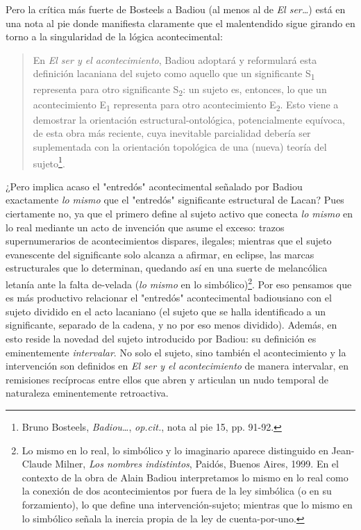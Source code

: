 Pero la crítica más fuerte de Bosteels a Badiou (al menos al de \emph{El
ser\ldots{}}) está en una nota al pie donde manifiesta claramente que el
malentendido sigue girando en torno a la singularidad de la lógica
acontecimental:

\begin{quote}
En \emph{El ser y el acontecimiento}, Badiou adoptará y reformulará esta
definición lacaniana del sujeto como aquello que un significante
S\textsubscript{1} representa para otro significante S\textsubscript{2}:
un sujeto es, entonces, lo que un acontecimiento E\textsubscript{1}
representa para otro acontecimiento E\textsubscript{2}. Esto viene a
demostrar la orientación estructural-ontológica, potencialmente
equívoca, de esta obra más reciente, cuya inevitable parcialidad debería
ser suplementada con la orientación topológica de una (nueva) teoría del
sujeto\footnote{Bruno Bosteels, \emph{Badiou\ldots{}}, \emph{op.cit.},
  nota al pie 15, pp. 91-92.}.
\end{quote}

¿Pero implica acaso el "entredós" acontecimental señalado por Badiou
exactamente \emph{lo mismo} que el "entredós" significante estructural
de Lacan? Pues ciertamente no, ya que el primero define al sujeto activo
que conecta \emph{lo mismo} en lo real mediante un acto de invención que
asume el exceso: trazos supernumerarios de acontecimientos dispares,
ilegales; mientras que el sujeto evanescente del significante solo
alcanza a afirmar, en eclipse, las marcas estructurales que lo
determinan, quedando así en una suerte de melancólica letanía ante la
falta de-velada (\emph{lo mismo} en lo simbólico)\footnote{Lo mismo en
  lo real, lo simbólico y lo imaginario aparece distinguido en
  Jean-Claude Milner, \emph{Los nombres indistintos}, Paidós, Buenos
  Aires, 1999. En el contexto de la obra de Alain Badiou interpretamos
  lo mismo en lo real como la conexión de dos acontecimientos por fuera
  de la ley simbólica (o en su forzamiento), lo que define una
  intervención-sujeto; mientras que lo mismo en lo simbólico señala la
  inercia propia de la ley de cuenta-por-uno.}. Por eso pensamos que es
más productivo relacionar el "entredós" acontecimental badiousiano con
el sujeto dividido en el acto lacaniano (el sujeto que se halla
identificado a un significante, separado de la cadena, y no por eso
menos dividido). Además, en esto reside la novedad del sujeto
introducido por Badiou: su definición es eminentemente
\emph{intervalar}. No solo el sujeto, sino también el acontecimiento y
la intervención son definidos en \emph{El ser y el acontecimiento} de
manera intervalar, en remisiones recíprocas entre ellos que abren y
articulan un nudo temporal de naturaleza eminentemente retroactiva.

